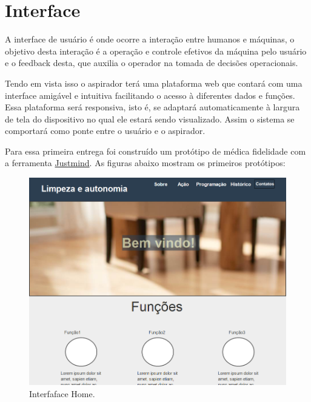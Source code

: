 \section{Interface} %
\label{sub:interface}
  A interface de usuário é onde ocorre a interação entre humanos e máquinas, o objetivo desta interação é a operação e controle efetivos da máquina pelo usuário e o feedback desta, que auxilia o operador na tomada de decisões operacionais.

  Tendo em vista isso o aspirador terá uma plataforma web que contará com uma interface amigável e intuitiva facilitando o acesso à diferentes dados e funções. Essa plataforma será responsiva, isto é, se adaptará automaticamente à largura de tela do dispositivo no qual ele estará sendo visualizado. Assim o sistema se comportará como ponte entre o usuário e o aspirador.

{Para essa primeira entrega foi construído um protótipo de médica fidelidade com a ferramenta  \href{http://www.justinmind.com/}{Justmind}.} As figuras abaixo mostram os primeiros protótipos:

\begin{figure}[H]                                    
  \centering                                         
  \includegraphics[scale=0.4]{figuras/home.png}
  \caption{Interfaface Home.}                        
  \label{img:inter_home}                              
\end{figure}                                         

